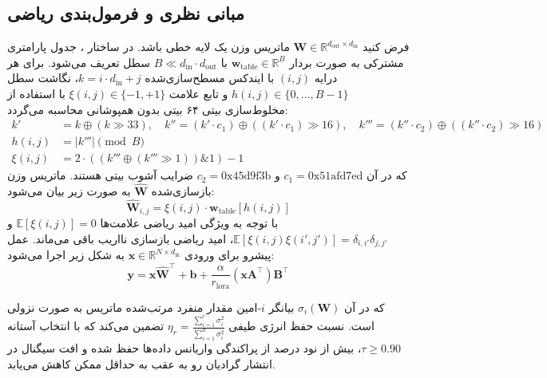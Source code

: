 \subsection{مبانی نظری و فرمول‌بندی ریاضی}
فرض کنید $\mathbf{W} \in \mathbb{R}^{d_{\text{out}} \times d_{\text{in}}}$ ماتریس وزن یک لایه خطی باشد. در ساختار ، جدول پارامتری مشترکی به صورت بردار $\mathbf{w}_{\text{table}} \in \mathbb{R}^{B}$ با $B \ll d_{\text{in}} \cdot d_{\text{out}}$ سطل تعریف می‌شود. برای هر درایه $(i, j)$ با ایندکس مسطح‌سازی‌شده $k = i \cdot d_{\text{in}} + j$، نگاشت سطل $h(i, j) \in \{0, \dots, B-1\}$ و تابع علامت $\xi(i, j) \in \{-1, +1\}$ با استفاده از مخلوط‌سازی بیتی ۶۴ بیتی بدون همپوشانی محاسبه می‌گردد:
\begin{align}
k' &= k \oplus (k \gg 33), \quad k'' = (k' \cdot c_1) \oplus ((k' \cdot c_1) \gg 16), \quad k''' = (k'' \cdot c_2) \oplus ((k'' \cdot c_2) \gg 16) \\
h(i, j) &= |k'''| \pmod B \\
\xi(i, j) &= 2 \cdot ((k''' \oplus (k''' \gg 1)) \mathbin{\&} 1) - 1
\end{align}
که در آن $c_1 = \text{0x51afd7ed}$ و $c_2 = \text{0x45d9f3b}$ ضرایب آشوب بیتی هستند. ماتریس وزن بازسازی‌شده $\hat{\mathbf{W}}$ به صورت زیر بیان می‌شود:
\begin{equation}
\hat{\mathbf{W}}_{i, j} = \xi(i, j) \cdot \mathbf{w}_{\text{table}}[h(i, j)]
\end{equation}
با توجه به ویژگی امید ریاضی علامت‌ها $\mathbb{E}[\xi(i, j)] = 0$ و $\mathbb{E}[\xi(i, j) \xi(i', j')] = \delta_{i, i'} \delta_{j, j'}$، امید ریاضی بازسازی نااریب باقی می‌ماند. عمل پیشرو برای ورودی $\mathbf{x} \in \mathbb{R}^{N \times d_{\text{in}}}$ به شکل زیر اجرا می‌شود:
\begin{equation}
\mathbf{y} = \mathbf{x} \hat{\mathbf{W}}^\top + \mathbf{b} + \frac{\alpha}{r_{\text{lora}}} (\mathbf{x} \mathbf{A}^\top) \mathbf{B}^\top
\end{equation}

که در آن $\sigma_i(\mathbf{W})$ بیانگر $i$-امین مقدار منفرد مرتب‌شده ماتریس به صورت نزولی است. نسبت حفظ انرژی طیفی $\eta_r = \frac{\sum_{i=1}^r \sigma_i^2}{\sum_{i=1}^{d} \sigma_i^2}$ تضمین می‌کند که با انتخاب آستانه $\tau \ge 0.90$، بیش از نود درصد از پراکندگی واریانس داده‌ها حفظ شده و افت سیگنال در انتشار گرادیان رو به عقب به حداقل ممکن کاهش می‌یابد.

